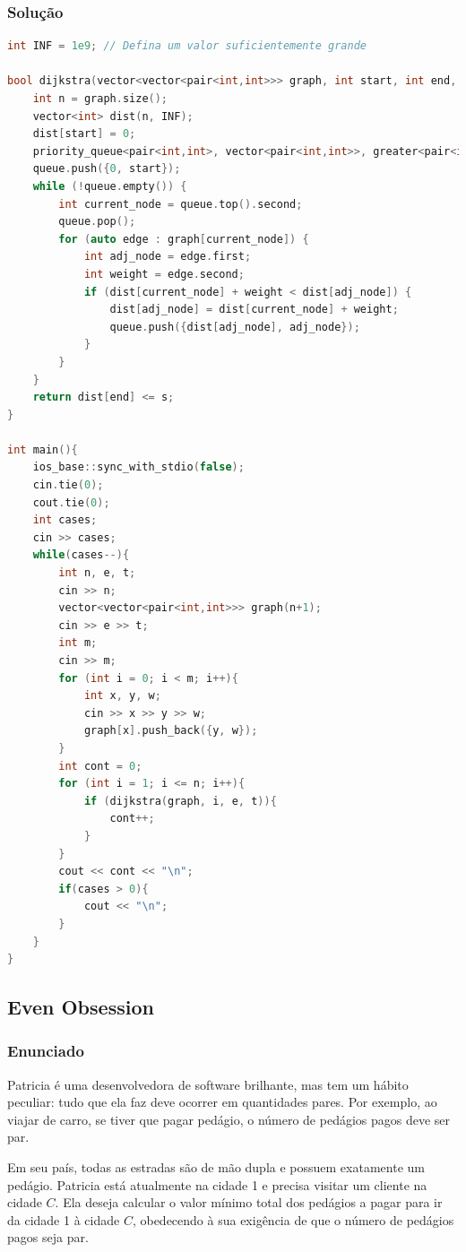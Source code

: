 \subsubsection*{Solução}
\begin{lstlisting}[language=C++]
int INF = 1e9; // Defina um valor suficientemente grande

bool dijkstra(vector<vector<pair<int,int>>> graph, int start, int end, int s) {
    int n = graph.size();
    vector<int> dist(n, INF);
    dist[start] = 0;
    priority_queue<pair<int,int>, vector<pair<int,int>>, greater<pair<int,int>>> queue;
    queue.push({0, start});
    while (!queue.empty()) {
        int current_node = queue.top().second;
        queue.pop();
        for (auto edge : graph[current_node]) {
            int adj_node = edge.first;
            int weight = edge.second;
            if (dist[current_node] + weight < dist[adj_node]) {
                dist[adj_node] = dist[current_node] + weight;
                queue.push({dist[adj_node], adj_node});
            }
        }
    }
    return dist[end] <= s;
}

int main(){
    ios_base::sync_with_stdio(false);
    cin.tie(0);
    cout.tie(0);
    int cases;
    cin >> cases;
    while(cases--){
        int n, e, t;
        cin >> n;
        vector<vector<pair<int,int>>> graph(n+1);
        cin >> e >> t;
        int m;
        cin >> m;
        for (int i = 0; i < m; i++){
            int x, y, w;
            cin >> x >> y >> w;
            graph[x].push_back({y, w});
        }
        int cont = 0;
        for (int i = 1; i <= n; i++){
            if (dijkstra(graph, i, e, t)){
                cont++;
            }
        }
        cout << cont << "\n";
        if(cases > 0){
            cout << "\n";
        }
    }
}
\end{lstlisting}

\subsection{Even Obsession}

\subsubsection*{Enunciado}
Patricia é uma desenvolvedora de software brilhante, mas tem um hábito peculiar: tudo que ela faz deve ocorrer em quantidades pares. Por exemplo, ao viajar de carro, se tiver que pagar pedágio, o número de pedágios pagos deve ser par.

Em seu país, todas as estradas são de mão dupla e possuem exatamente um pedágio. Patricia está atualmente na cidade 1 e precisa visitar um cliente na cidade \(C\). Ela deseja calcular o valor mínimo total dos pedágios a pagar para ir da cidade 1 à cidade \(C\), obedecendo à sua exigência de que o número de pedágios pagos seja par.

